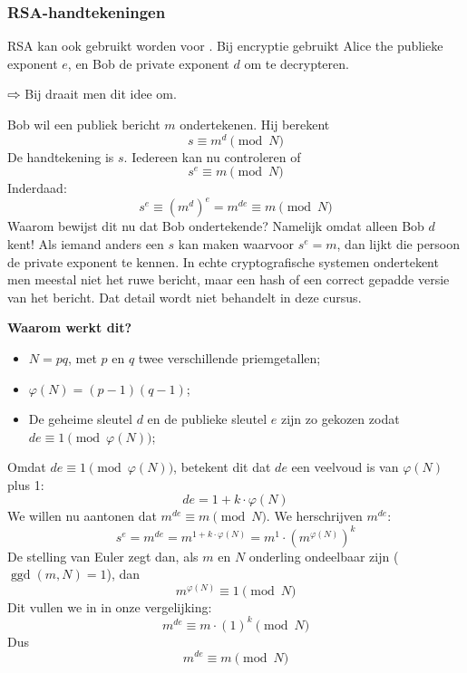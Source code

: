 \subsubsection{RSA-handtekeningen}

RSA kan ook gebruikt worden voor . Bij encryptie gebruikt Alice the publieke exponent $e$, en Bob de private exponent $d$ om te decrypteren.

$\rightwhitearrow$ Bij  draait men dit idee om.

Bob wil een publiek bericht $m$ ondertekenen. Hij berekent
\begin{equation*}
    s \equiv m^d \pmod N
\end{equation*}
De handtekening is $s$. Iedereen kan nu controleren of
\begin{equation*}
    s^e \equiv m \pmod N
\end{equation*}
Inderdaad:
\begin{equation*}
    s^e \equiv (m^d)^e = m^{de} \equiv m \pmod N 
\end{equation*}
Waarom bewijst dit nu dat Bob ondertekende? Namelijk omdat alleen Bob $d$ kent! Als iemand anders een $s$ kan maken waarvoor $s^e = m$, dan lijkt die persoon de private exponent te kennen.
In echte cryptografische systemen ondertekent men meestal niet het ruwe bericht, maar een hash of een correct gepadde versie van het bericht. Dat detail wordt niet behandelt in deze cursus.

\textbf{Waarom werkt dit?}  \newline
{}
\begin{itemize}
    \item $N = pq$, met $p$ en $q$ twee verschillende priemgetallen;
    \item $\varphi(N) = (p-1)(q-1)$;
    \item De geheime sleutel $d$ en de publieke sleutel $e$ zijn zo gekozen zodat $de \equiv 1 \pmod {\varphi(N)}$;
\end{itemize}
Omdat $de \equiv 1 \pmod {\varphi(N)}$, betekent dit dat $de$ een veelvoud is van $\varphi(N)$ plus 1:
\begin{equation*}
    de = 1 + k \cdot \varphi(N)
\end{equation*}
 We willen nu aantonen dat $m^{de} \equiv m \pmod {N}$. We herschrijven $m^{de}$:
\begin{equation*}
    s^e = m^{de} = m^{1 + k \cdot \varphi(N)} = m^1 \cdot \left(m^{\varphi(N)}\right)^k
\end{equation*}
De stelling van Euler zegt dan, als $m$ en $N$ onderling ondeelbaar zijn ($\operatorname{ggd}(m,N)=1$), dan
\begin{equation*}
    m^{\varphi(N)} \equiv 1 \pmod N
\end{equation*}
Dit vullen we in in onze vergelijking:
\begin{equation*}
    m^{de} \equiv m \cdot (1)^k \pmod N
\end{equation*}
Dus
\begin{equation*}
    m^{de} \equiv m \pmod N
\end{equation*}

